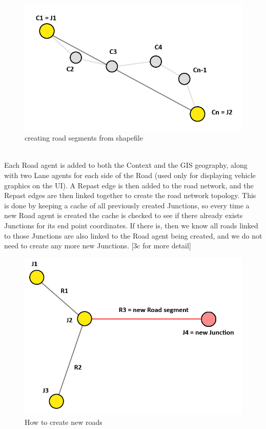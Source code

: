 \documentclass[11pt]{article}
\begin{document}
\begin{figure}[H]
\begin{center}
\includegraphics[scale=0.4]{creating_road_segments_from_shapefile}
\caption{creating road segments from shapefile}
\end{center}
\end{figure}

\\
Each Road agent is added to both the Context and the GIS geography, along with two Lane agents for each side of the Road (used only for displaying vehicle graphics on the UI). A Repast edge is then added to the road network, and the Repast edges are then linked together to create the road network topology. This is done by keeping a cache of all previously created Junctions, so every time a new Road agent is created the cache is checked to see if there already exists Junctions for its end point coordinates. If there is, then we know all roads linked to those Junctions are also linked to the Road agent being created, and we do not need to create any more new Junctions. [3c for more detail] 
\\

\begin{figure}[H]
\begin{center}
\includegraphics[scale=0.3]{creating_new_roads}
\caption{How to create new roads}
\end{center}
\end{figure}
\end{document}
